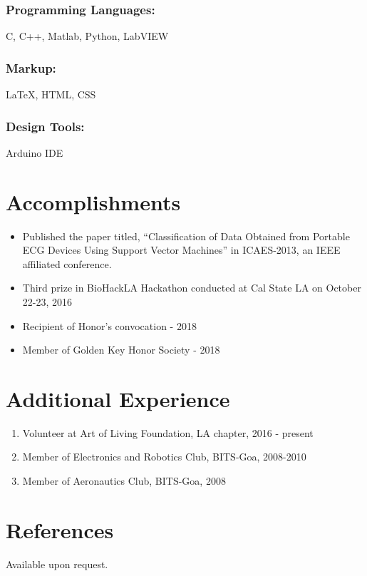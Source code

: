 \documentclass{article}
\begin{document}
\subsubsection{Programming Languages:} 
C, C++, Matlab, Python, LabVIEW
\subsubsection{Markup:} 
{\LaTeX}, HTML, CSS
\subsubsection{Design Tools:} 
Arduino IDE


\section{Accomplishments}
\begin{itemize}
    \item Published the paper titled, “Classification of Data Obtained from Portable ECG Devices Using Support Vector Machines” in ICAES-2013, an IEEE affiliated conference.
    \item Third prize in BioHackLA Hackathon conducted at Cal State LA on October 22-23, 2016
    \item Recipient of Honor's convocation - 2018
    \item Member of Golden Key Honor Society - 2018
\end{itemize}

\section{Additional Experience}
\begin{enumerate}
    \item Volunteer at Art of Living Foundation, LA chapter, 2016 - present
    \item Member of Electronics and Robotics Club, BITS-Goa, 2008-2010
    \item Member of Aeronautics Club, BITS-Goa, 2008
\end{enumerate}


\section{References}
Available upon request.
\end{document}
